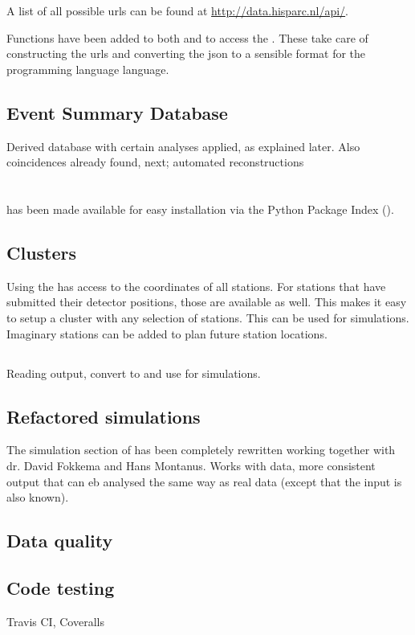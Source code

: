 A list of all possible urls can be found at \url{http://data.hisparc.nl/api/}.

Functions have been added to both \sapphire and \jsparc to access the
\api. These take care of constructing the urls and converting the json to a
sensible format for the programming language language.


\subsection{Event Summary Database}

Derived database with certain analyses applied, as explained later. Also
coincidences already found, next; automated reconstructions


\section{\sapphire}


\subsection{\pypi}

\sapphire has been made available for easy installation via the Python
Package Index (\pypi).


\subsection{Clusters}

Using the \api \sapphire has access to the \gps coordinates of all
stations. For stations that have submitted their detector positions,
those are available as well. This makes it easy to setup a cluster with
any selection of \hisparc stations. This can be used for simulations.
Imaginary stations can be added to plan future station locations.

\subsection{\corsika}

Reading \corsika output, convert to \hdf and use for simulations.


\subsection{Refactored simulations}

The simulation section of \sapphire has been completely rewritten
working together with dr. David Fokkema and Hans Montanus. Works with
\corsika data, more consistent output that can eb analysed the same way
as real \hisparc data (except that the input is also known).


\subsection{Data quality}



\subsection{Code testing}

Travis CI, Coveralls
